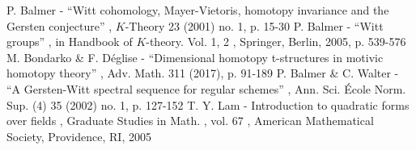  P. Balmer - “Witt cohomology, Mayer-Vietoris, homotopy invariance and the Gersten conjecture” , $K$-Theory 23 (2001) no. 1, p. 15-30
 P. Balmer - “Witt groups” , in Handbook of $K$-theory. Vol. 1, 2 , Springer, Berlin, 2005, p. 539-576
 M. Bondarko \& F. Déglise - “Dimensional homotopy t-structures in motivic homotopy theory” , Adv. Math. 311 (2017), p. 91-189
 P. Balmer \& C. Walter - “A Gersten-Witt spectral sequence for regular schemes” , Ann. Sci. École Norm. Sup. (4) 35 (2002) no. 1, p. 127-152
 T. Y. Lam - Introduction to quadratic forms over fields , Graduate Studies in Math. , vol. 67 , American Mathematical Society, Providence, RI, 2005
